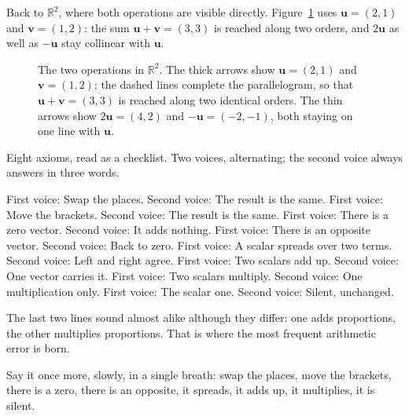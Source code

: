 Back to $\mathbb{R}^{2}$, where both operations are visible directly.
Figure~\ref{fig:ch06-dua-operasi} uses $\mathbf{u}=(2,1)$ and $\mathbf{v}=(1,2)$: the sum
$\mathbf{u}+\mathbf{v}=(3,3)$ is reached along two orders, and $2\mathbf{u}$ as well as
$-\mathbf{u}$ stay collinear with $\mathbf{u}$.

\begin{figure}[htbp]
\centering
{}
\caption{The two operations in $\mathbb{R}^{2}$. The thick arrows show $\mathbf{u}=(2,1)$ and
$\mathbf{v}=(1,2)$; the dashed lines complete the parallelogram, so that
$\mathbf{u}+\mathbf{v}=(3,3)$ is reached along two identical orders. The thin arrows show
$2\mathbf{u}=(4,2)$ and $-\mathbf{u}=(-2,-1)$, both staying on one line with
$\mathbf{u}$.}
\label{fig:ch06-dua-operasi}
\end{figure}

\begin{bacakeras}
Eight axioms, read as a checklist. Two voices, alternating; the second voice always answers in
three words.

First voice: Swap the places. Second voice: The result is the same.
First voice: Move the brackets. Second voice: The result is the same.
First voice: There is a zero vector. Second voice: It adds nothing.
First voice: There is an opposite vector. Second voice: Back to zero.
First voice: A scalar spreads over two terms. Second voice: Left and right agree.
First voice: Two scalars add up. Second voice: One vector carries it.
First voice: Two scalars multiply. Second voice: One multiplication only.
First voice: The scalar one. Second voice: Silent, unchanged.

The last two lines sound almost alike although they differ: one adds proportions, the other
multiplies proportions. That is where the most frequent arithmetic error is born.

Say it once more, slowly, in a single breath: swap the places, move the brackets, there is a
zero, there is an opposite, it spreads, it adds up, it multiplies, it is silent.
\end{bacakeras}


